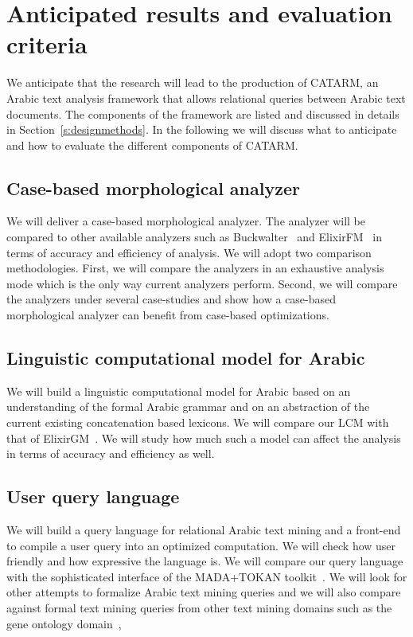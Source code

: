 \documentclass[12pt]{article}
\begin{document}
{\section{Anticipated results and evaluation criteria}
\label{s:results}

We anticipate that the research will lead to the production of 
CATARM, an Arabic text analysis framework that allows relational 
queries between Arabic text documents.
The components of the framework are listed and discussed
in details in Section~\ref{s:designmethods}.
In the following we will discuss what to anticipate and 
how to evaluate the different components of CATARM. 

\subsection{Case-based morphological analyzer} 

We will deliver a case-based morphological analyzer. 
The analyzer will be compared to other available analyzers such as
Buckwalter~\cite{Tim04} and ElixirFM~\cite{Otakar:07} in terms
of accuracy and efficiency of analysis.
We will adopt two comparison methodologies. 
First, we will compare the analyzers in an exhaustive analysis mode
which is the only way current analyzers perform. 
Second, we will compare the analyzers under several case-studies
and show how a case-based morphological analyzer can benefit
from case-based optimizations.

\subsection{Linguistic computational model for Arabic}

We will build a linguistic computational model for Arabic 
based on an understanding of the formal Arabic grammar 
and on an abstraction of the current existing concatenation
based lexicons.
We will compare our LCM with that of ElixirGM~\cite{Otakar:07}.
We will study how much such a model can affect the analysis
in terms of accuracy and efficiency as well. 

\subsection{User query language}

We will build a query language for relational Arabic text mining 
and a front-end to compile a user query into an optimized
computation. 
We will check how user friendly and how expressive the language is.
We will compare our query language with the sophisticated 
interface of the MADA+TOKAN toolkit~\cite{Habash:09}.
We will look for other attempts to formalize Arabic text 
mining queries and we will also compare against 
formal text mining queries from other text mining domains such
as the gene ontology domain~\cite{GeneOntology10},

}
\end{document}
